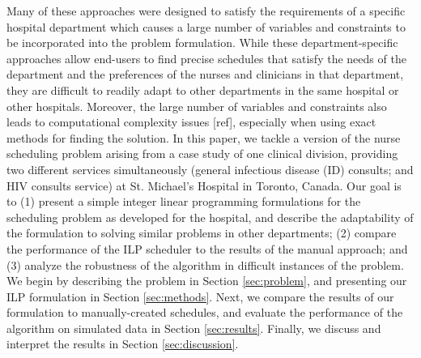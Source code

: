 Many of these approaches were designed to satisfy the requirements of a specific hospital department which causes a large number of variables and constraints to be incorporated into the problem formulation. While these department-specific approaches allow end-users to find precise schedules that satisfy the needs of the department and the preferences of the nurses and clinicians in that department, they are difficult to readily adapt to other departments in the same hospital or other hospitals. %
Moreover, the large number of variables and constraints also leads to computational complexity issues [ref], especially when using exact methods for finding the solution. In this paper, we tackle a version of the nurse scheduling problem arising from a case study of one clinical division, providing two different services simultaneously (general infectious disease (ID) consults; and HIV consults service) at St. Michael's Hospital in Toronto, Canada. Our goal is to (1) present a simple integer linear programming formulations for the scheduling problem as developed for the hospital, and describe the adaptability of the formulation to solving similar problems in other departments; (2) compare the performance of the ILP scheduler to the results of the manual approach; and (3) analyze the robustness of the algorithm in difficult instances of the problem. \\

We begin by describing the problem in Section \ref{sec:problem}, and presenting our ILP formulation in Section \ref{sec:methods}. Next, we compare the results of our formulation to manually-created schedules, and evaluate the performance of the algorithm on simulated data in Section \ref{sec:results}. Finally, we discuss and interpret the results in Section \ref{sec:discussion}. %